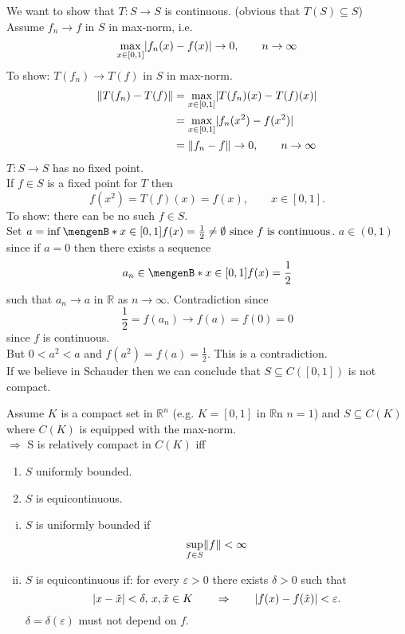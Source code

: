 \begin{beispiel}
	We want to show that $T: S \to S$ is continuous. (obvious that $T(S) \subseteq S$)\\ Assume $f_n \to f$ in $S$ in max-norm, i.e.
	\[
		\max_{x \in [0,1]} \lvert f_n(x)-f(x)\rvert \to 0, \qquad n \to \infty
	\]
	To show: $T(f_n) \to T(f)$ in $S$ in max-norm.
	\begin{align*}
		\norm{T(f_n)-T(f)} &= \max_{x \in [0,1]}\abs{T(f_n)(x)- T(f)(x)} \\ & = \max_{x \in [0,1]}\abs{f_n(x^2)-f(x^2)}  \\ &= \norm{f_n -f} \to 0, \qquad n \to \infty
	\end{align*}
	$T: S \to S $ has no fixed point. \\
	If $f \in S$ is a fixed point for $T$ then 
	\[
		f(x^2) = T(f)(x) = f(x), \qquad x \in [0,1].
	\]
	To show: there can be no such $f \in S$. \\
	Set $a = \inf \set[x \in [0,1]]{f(x) = \frac{1}{2}} \neq \emptyset \text{ since $f$ is continuous}$. $a \in (0,1)$ since if $a = 0$ then there exists a sequence
	\[
		a_n \in \set[x \in [0,1]]{f(x)= \frac{1}{2}} 
	\]
	such that $a_n \to a$ in $\mathbb{R}$ as $n \to \infty$. Contradiction since 
	\[
		\frac{1}{2} = f(a_n) \to f(a) = f(0) = 0
	\]
	since $f$ is continuous. \\
	But $0 < a^2 < a$ and $f(a^2) = f(a) = \frac{1}{2}$. This is a contradiction. \\
	If we believe in Schauder then we can conclude that $S \subseteq C([0,1])$ is not compact.
\end{beispiel}
\begin{theorem}
	Assume $K$ is a compact set in $\mathbb{R}^n$ (e.g. $K = [0,1]$ in $\mathbb{R}$n $n=1$) and $S \subseteq C(K)$ where $C(K)$ is equipped with the max-norm. \\
	$\Rightarrow $ S is relatively compact in $C(K)$ iff
	\begin{enumerate}[(1)]
		\item $S$ uniformly bounded.
		\item $S$ is equicontinuous.
	\end{enumerate}
\end{theorem}
\begin{definition*}
	\begin{enumerate}[(i)]
		\item $S$ is uniformly bounded if
		\[
			\sup\limits_{f \in S} \norm{f} < \infty
		\]
		\item $S$ is equicontinuous if: for every $\varepsilon >0$ there exists $\delta >0$ such that
		\[
			\lvert x- \tilde x\rvert < \delta, \, x, \tilde x \in K \qquad \Rightarrow \qquad \lvert f(x)-f(\tilde x)\rvert< \varepsilon.
		\]
		$\delta = \delta (\varepsilon)$ must not depend on $f$. \\
	\end{enumerate}
\end{definition*}
